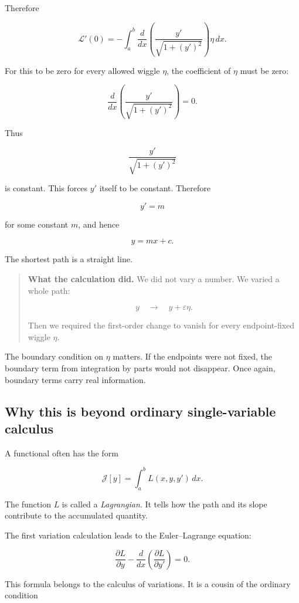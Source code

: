 Therefore

\[
\mathcal{L}'(0)
=
-
\int_a^b
\frac{d}{dx}
\left(
\frac{y'}{\sqrt{1+(y')^2}}
\right)
\eta\,dx.
\]

For this to be zero for every allowed wiggle \(\eta\), the coefficient of \(\eta\) must be
zero:

\[
\frac{d}{dx}
\left(
\frac{y'}{\sqrt{1+(y')^2}}
\right)
=0.
\]

Thus

\[
\frac{y'}{\sqrt{1+(y')^2}}
\]

is constant.  This forces \(y'\) itself to be constant.  Therefore

\[
y'=m
\]

for some constant \(m\), and hence

\[
\boxed{
y=mx+c.
}
\]

The shortest path is a straight line.

\begin{quote}
\textbf{What the calculation did.}
We did not vary a number.  We varied a whole path:

\[
y\quad\longrightarrow\quad y+\varepsilon\eta.
\]

Then we required the first-order change to vanish for every endpoint-fixed wiggle
\(\eta\).
\end{quote}

The boundary condition on \(\eta\) matters.  If the endpoints were not fixed, the
boundary term from integration by parts would not disappear.  Once again, boundary
terms carry real information.

\subsection{Why this is beyond ordinary single-variable calculus}
\label{subsec:why-variation-beyond-single-variable}

A functional often has the form

\[
\mathcal{J}[y]
=
\int_a^b L(x,y,y')\,dx.
\]

The function \(L\) is called a \emph{Lagrangian}.  It tells how the path and its slope
contribute to the accumulated quantity.

The first variation calculation leads to the Euler--Lagrange equation:

\[
\boxed{
\frac{\partial L}{\partial y}
-
\frac{d}{dx}
\left(
\frac{\partial L}{\partial y'}
\right)
=0.
}
\]

This formula belongs to the calculus of variations.  It is a cousin of the ordinary
condition

